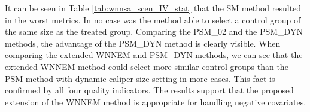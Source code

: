 		\begin{table}[h]
			\caption{Quality measures for Scenario IV. %
			}
			\label{tab:wnnsa_scen_IV_stat}
			\centering
														
		\end{table}
								
		It can be seen in Table \ref{tab:wnnsa_scen_IV_stat} that the SM method resulted in the worst metrics. In no case was the method able to select a control group of the same size as the treated group. Comparing the PSM\_02 and the PSM\_DYN methods, the advantage of the PSM\_DYN method is clearly visible. When comparing the extended WNNEM and PSM\_DYN methods, we can see that the extended WNNEM method could select more similar control groups than the PSM method with dynamic caliper size setting in more cases. This fact is confirmed by all four quality indicators. The results support that the proposed extension of the WNNEM method is appropriate for handling negative covariates.  
								
